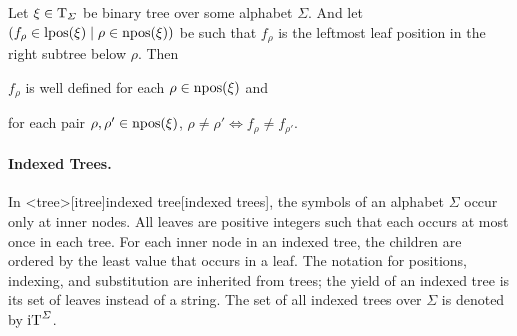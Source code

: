 \documentclass[../document.tex]{subfiles}
\begin{document}
    \begin{lemma}\label{lem:firstviasecond}
        Let \(\xi \in \operatorname{T}_{\varSigma}\) be binary tree over some alphabet \(\varSigma\).
        And let \((f_\rho \in \operatorname{lpos}(\xi) \mid \rho \in \operatorname{npos}(\xi))\) be such that \(f_\rho\) is the leftmost leaf position in the right subtree below \(\rho\).
        Then
        \begin{inparaenum}
            \item \(f_\rho\) is well defined for each \(\rho \in \operatorname{npos}(\xi)\) and
            \item for each pair \(\rho, \rho' \in \operatorname{npos}(\xi)\), \(\rho \neq \rho' \iff f_\rho \neq f_{\rho'}\).
        \end{inparaenum}
    \end{lemma}


    \paragraph{Indexed Trees.}
    In <tree>[itree]{indexed tree}[indexed trees], the symbols of an alphabet \(\varSigma\) occur only at inner nodes.
    All leaves are positive integers such that each occurs at most once in each tree.
    For each inner node in an indexed tree, the children are ordered by the least value that occurs in a leaf.
    The notation for positions, indexing, and substitution are inherited from trees; the yield of an indexed tree is its set of leaves instead of a string.
    The set of all indexed trees over \(\varSigma\) is denoted by \(\operatorname{iT}^\varSigma\).
\end{document}
